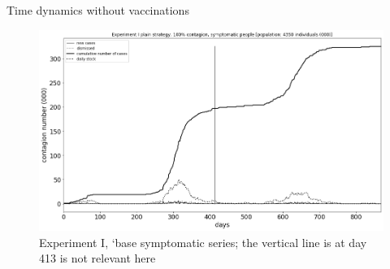 \documentclass[9pt]{beamer}
\begin{document}
\begin{frame}{Time dynamics without vaccinations}

\begin{figure}[H]
\center
\includegraphics[scale=0.16]{Experiment_I_base_symptomatic_series.png} 

\caption{Experiment I, `base symptomatic series; the vertical line is at day 413 is not relevant here} 
\label{Experiment_I_plainSymptomaticSeries}
\end{figure}


\end{frame}

\end{document}
